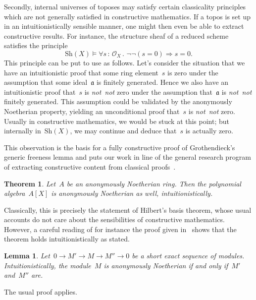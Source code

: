 \documentclass[10pt,reqno,a4paper]{amsbook}
\makeatletter
\theoremstyle{definition}
\theoremstyle{plain}
\newtheorem{lemma}[defn]{Lemma}
\newtheorem{thm}[defn]{Theorem}
\theoremstyle{remark}
\renewcommand{\O}{\mathcal{O}}
\newcommand{\aaa}{\mathfrak{a}}
\newcommand{\Sh}{\mathrm{Sh}}
\newcommand{\?}{\,{:}\,}
\renewcommand{\_}{\mathpunct{.}\,}
\newcommand{\notnot}{\emph{not~not}\xspace}
\renewenvironment{proof}[1][\proofname]{\par
  \pushQED{\qed}%
  \normalfont \topsep6\p@\@plus6\p@\relax
  \trivlist
  \item[\hskip\labelsep
        \itshape
    #1\@addpunct{.}]\ignorespaces
}{%
  \popQED\endtrivlist\@endpefalse
}
\makeatother
\begin{document}
{Secondly, internal universes of toposes may satisfy certain classicality
principles which are not generally satisfied in constructive mathematics. If
a topos is set up in an intuitionistically sensible manner, one might then even
be able to extract constructive results. For instance, the structure sheaf of a
reduced scheme satisfies the principle
\[ \Sh(X) \models \forall s\?\O_X\_
  \neg\neg(s = 0) \Longrightarrow s = 0. \]
This principle can be put to use as follows. Let's consider the situation that
we have an intuitionistic proof that some ring element~$s$ is zero under the
assumption that some ideal~$\aaa$ is finitely generated. Hence we also have an
intuitionistic proof that~$s$ is \notnot zero under the assumption that~$\aaa$
is \notnot finitely generated. This assumption could be validated by the anonymously
Noetherian property, yielding an unconditional proof that~$s$ is \notnot zero.
Usually in constructive mathematics, we would be stuck at this point; but
internally in~$\Sh(X)$, we may continue and deduce that~$s$ is actually zero.

This observation is the basis for a fully constructive proof of Grothendieck's
generic freeness lemma and puts our work in line of the general research
program of extracting constructive content from classical
proofs~\cite{coquand:classical,feferman:kreisel,kohlenbach:applprooftheory,kiselyov:lem}.

\begin{thm}\label{thm:hilbert}
Let~$A$ be an anonymously Noetherian ring. Then the polynomial
algebra~$A[X]$ is anonymously Noetherian as well, intuitionistically.
\end{thm}
\begin{proof}Classically, this is precisely the statement of Hilbert's basis
theorem, whose usual accounts do not care about the sensibilities of
constructive mathematics. However, a careful reading of for instance the proof
given in~\cite[Theorem~7.5]{atiyah:macdonald:commutative-algebra} shows that
the theorem holds intuitionistically as stated.
\end{proof}

\begin{lemma}Let~$0 \to M' \to M \to M'' \to 0$ be a short exact sequence of
modules. Intuitionistically, the module~$M$ is anonymously Noetherian if and only
if~$M'$ and~$M''$ are.
\end{lemma}

\begin{proof}The usual proof applies.\end{proof}

}
\end{document}
